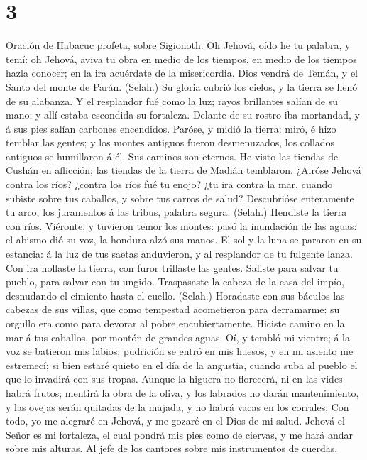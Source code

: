 \hypertarget{section-2}{%
\section{3}\label{section-2}}

 Oración de Habacuc profeta, sobre Sigionoth. 
Oh Jehová, oído he tu palabra, y temí: oh Jehová, aviva tu obra en medio
de los tiempos, en medio de los tiempos hazla conocer; en la ira
acuérdate de la misericordia.  Dios vendrá de Temán, y el
Santo del monte de Parán. (Selah.) Su gloria cubrió los cielos, y la
tierra se llenó de su alabanza.  Y el resplandor fué como la
luz; rayos brillantes salían de su mano; y allí estaba escondida su
fortaleza.  Delante de su rostro iba mortandad, y á sus pies
salían carbones encendidos.  Paróse, y midió la tierra:
miró, é hizo temblar las gentes; y los montes antiguos fueron
desmenuzados, los collados antiguos se humillaron á él. Sus caminos son
eternos.  He visto las tiendas de Cushán en aflicción; las
tiendas de la tierra de Madián temblaron.  ¿Airóse Jehová
contra los ríos? ¿contra los ríos fué tu enojo? ¿tu ira contra la mar,
cuando subiste sobre tus caballos, y sobre tus carros de salud?
 Descubrióse enteramente tu arco, los juramentos á las
tribus, palabra segura. (Selah.) Hendiste la tierra con ríos.
 Viéronte, y tuvieron temor los montes: pasó la inundación
de las aguas: el abismo dió su voz, la hondura alzó sus manos.
 El sol y la luna se pararon en su estancia: á la luz de
tus saetas anduvieron, y al resplandor de tu fulgente lanza.
 Con ira hollaste la tierra, con furor trillaste las
gentes.  Saliste para salvar tu pueblo, para salvar con tu
ungido. Traspasaste la cabeza de la casa del impío, desnudando el
cimiento hasta el cuello. (Selah.)  Horadaste con sus
báculos las cabezas de sus villas, que como tempestad acometieron para
derramarme: su orgullo era como para devorar al pobre encubiertamente.
 Hiciste camino en la mar á tus caballos, por montón de
grandes aguas.  Oí, y tembló mi vientre; á la voz se
batieron mis labios; pudrición se entró en mis huesos, y en mi asiento
me estremecí; si bien estaré quieto en el día de la angustia, cuando
suba al pueblo el que lo invadirá con sus tropas.  Aunque
la higuera no florecerá, ni en las vides habrá frutos; mentirá la obra
de la oliva, y los labrados no darán mantenimiento, y las ovejas serán
quitadas de la majada, y no habrá vacas en los corrales; 
Con todo, yo me alegraré en Jehová, y me gozaré en el Dios de mi salud.
 Jehová el Señor es mi fortaleza, el cual pondrá mis pies
como de ciervas, y me hará andar sobre mis alturas. Al jefe de los
cantores sobre mis instrumentos de cuerdas.
